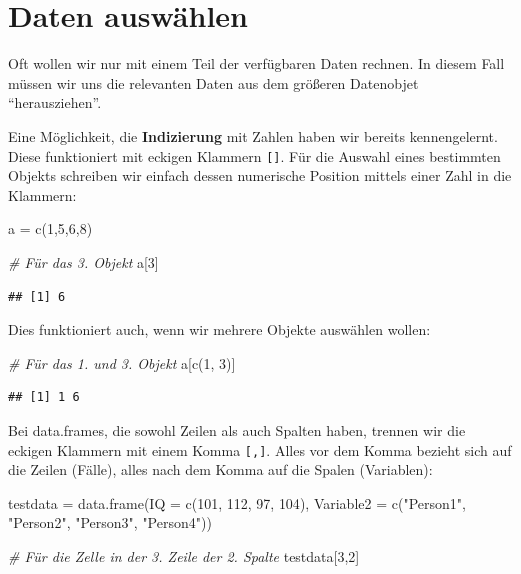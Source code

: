 \documentclass[
]{book}
\newenvironment{Shaded}{\begin{snugshade}}{\end{snugshade}}
\newcommand{\AttributeTok}[1]{\textcolor[rgb]{0.77,0.63,0.00}{#1}}
\newcommand{\CommentTok}[1]{\textcolor[rgb]{0.56,0.35,0.01}{\textit{#1}}}
\newcommand{\DecValTok}[1]{\textcolor[rgb]{0.00,0.00,0.81}{#1}}
\newcommand{\FunctionTok}[1]{\textcolor[rgb]{0.00,0.00,0.00}{#1}}
\newcommand{\NormalTok}[1]{#1}
\newcommand{\OtherTok}[1]{\textcolor[rgb]{0.56,0.35,0.01}{#1}}
\newcommand{\StringTok}[1]{\textcolor[rgb]{0.31,0.60,0.02}{#1}}
\begin{document}
\hypertarget{daten-auswuxe4hlen}{%
\chapter{Daten auswählen}\label{daten-auswuxe4hlen}}

Oft wollen wir nur mit einem Teil der verfügbaren Daten rechnen. In diesem Fall müssen wir uns die relevanten Daten aus dem größeren Datenobjet ``herausziehen''.

Eine Möglichkeit, die \textbf{Indizierung} mit Zahlen haben wir bereits kennengelernt. Diese funktioniert mit eckigen Klammern \texttt{{[}{]}}. Für die Auswahl eines bestimmten Objekts schreiben wir einfach dessen numerische Position mittels einer Zahl in die Klammern:

\begin{Shaded}
\begin{Highlighting}[]
\NormalTok{a }\OtherTok{=} \FunctionTok{c}\NormalTok{(}\DecValTok{1}\NormalTok{,}\DecValTok{5}\NormalTok{,}\DecValTok{6}\NormalTok{,}\DecValTok{8}\NormalTok{)}

\CommentTok{\# Für das 3. Objekt}
\NormalTok{a[}\DecValTok{3}\NormalTok{]}
\end{Highlighting}
\end{Shaded}

\begin{verbatim}
## [1] 6
\end{verbatim}

Dies funktioniert auch, wenn wir mehrere Objekte auswählen wollen:

\begin{Shaded}
\begin{Highlighting}[]
\CommentTok{\# Für das 1. und 3. Objekt}
\NormalTok{a[}\FunctionTok{c}\NormalTok{(}\DecValTok{1}\NormalTok{, }\DecValTok{3}\NormalTok{)]}
\end{Highlighting}
\end{Shaded}

\begin{verbatim}
## [1] 1 6
\end{verbatim}

Bei data.frames, die sowohl Zeilen als auch Spalten haben, trennen wir die eckigen Klammern mit einem Komma \texttt{{[},{]}}. Alles vor dem Komma bezieht sich auf die Zeilen (Fälle), alles nach dem Komma auf die Spalen (Variablen):

\begin{Shaded}
\begin{Highlighting}[]
\NormalTok{testdata }\OtherTok{=} \FunctionTok{data.frame}\NormalTok{(}\AttributeTok{IQ =} \FunctionTok{c}\NormalTok{(}\DecValTok{101}\NormalTok{, }\DecValTok{112}\NormalTok{, }\DecValTok{97}\NormalTok{, }\DecValTok{104}\NormalTok{),}
                     \AttributeTok{Variable2 =} \FunctionTok{c}\NormalTok{(}\StringTok{"Person1"}\NormalTok{, }\StringTok{"Person2"}\NormalTok{, }\StringTok{"Person3"}\NormalTok{, }\StringTok{"Person4"}\NormalTok{))}

\CommentTok{\# Für die Zelle in der 3. Zeile der 2. Spalte}
\NormalTok{testdata[}\DecValTok{3}\NormalTok{,}\DecValTok{2}\NormalTok{]}
\end{Highlighting}
\end{Shaded}
\end{document}

